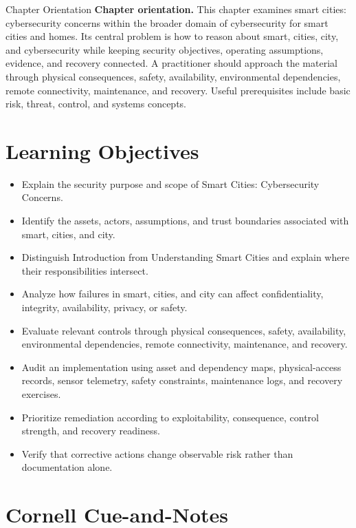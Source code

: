 \documentclass[11pt,letterpaper]{article}
\title{\CornellDocumentTitle}
\author{}
\date{}
\begin{document}
\maketitle
\begin{CornellOverviewBox}{Chapter Orientation}
\textbf{Chapter orientation.} This chapter examines smart cities: cybersecurity concerns within the broader domain of cybersecurity for smart cities and homes. Its central problem is how to reason about smart, cities, city, and cybersecurity while keeping security objectives, operating assumptions, evidence, and recovery connected. A practitioner should approach the material through physical consequences, safety, availability, environmental dependencies, remote connectivity, maintenance, and recovery. Useful prerequisites include basic risk, threat, control, and systems concepts.
\end{CornellOverviewBox}
\section*{Learning Objectives}
\begin{itemize}
\item Explain the security purpose and scope of Smart Cities: Cybersecurity Concerns.
\item Identify the assets, actors, assumptions, and trust boundaries associated with smart, cities, and city.
\item Distinguish Introduction from Understanding Smart Cities and explain where their responsibilities intersect.
\item Analyze how failures in smart, cities, and city can affect confidentiality, integrity, availability, privacy, or safety.
\item Evaluate relevant controls through physical consequences, safety, availability, environmental dependencies, remote connectivity, maintenance, and recovery.
\item Audit an implementation using asset and dependency maps, physical-access records, sensor telemetry, safety constraints, maintenance logs, and recovery exercises.
\item Prioritize remediation according to exploitability, consequence, control strength, and recovery readiness.
\item Verify that corrective actions change observable risk rather than documentation alone.
\end{itemize}
\section*{Cornell Cue-and-Notes}
\end{document}
